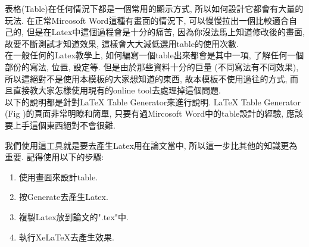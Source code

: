 
表格(Table)在任何情況下都是一個常用的顯示方式, 所以如何設計它都會有大量的玩法. 在正常Mircosoft Word這種有畫面的情況下, 可以慢慢拉出一個比較適合自己的, 但是在Latex中這個過程會是十分的痛苦, 因為你沒法馬上知道修改後的畫面, 故要不斷測試才知道效果, 這樣會大大減低選用table的使用次數.\\

在一般任何的Latex教學上, 如何編寫一個table出來都會是其中一項, 了解任何一個部份的寫法, 位置, 設定等. 但是由於那些資料十分的巨量 (不同寫法有不同效果), 所以這絕對不是使用本模板的大家想知道的東西, 故本模板不使用過往的方式, 而且直接教大家怎樣使用現有的online tool去處理掉這個問題.\\

以下的說明都是針對LaTeX Table Generator來進行說明. LaTeX Table Generator (Fig )的頁面非常明瞭和簡單, 只要有過Mircosoft Word中的table設計的經驗, 應該要上手這個東西絕對不會很難.


\newpage
{}

  我們使用這工具就是要去產生Latex用在論文當中, 所以這一步比其他的知識更為重要. 記得使用以下的步驟:

  \begin{enumerate}
  \item
  {
    使用畫面來設計table.
  } %

  \item
  {
    按Generate去產生Latex.
  } %

  \item
  {
    複製Latex放到論文的".tex"中.
  } %

  \item
  {
    執行XeLaTeX去產生效果.
  } %
  \end{enumerate}

